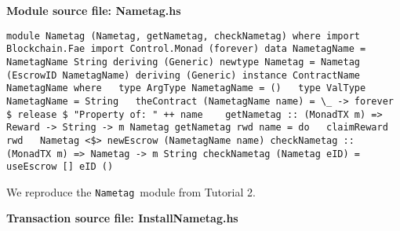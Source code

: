 \documentclass[11pt]{article}
\newcommand{\codeblock}[1]{\begin{mdframed}[
    backgroundcolor=header-color,
    linecolor=header-color,
    innertopmargin=10pt,
    ]{\texttt{#1}}\end{mdframed}}
\begin{document}

\vspace{11pt}

\textbf{Module source file: Nametag.hs}

\codeblock{module Nametag (Nametag, getNametag, checkNametag) where\newline
\newline
import Blockchain.Fae\newline
import Control.Monad (forever)\newline
\newline
data NametagName = NametagName String deriving (Generic)\newline
newtype Nametag = Nametag (EscrowID NametagName) deriving (Generic)\newline
\newline
instance ContractName NametagName where\newline
  type ArgType NametagName = ()\newline
  type ValType NametagName = String\newline
  theContract (NametagName name) = \textbackslash{}\_ -\textgreater{} forever \$ release \$ "Property of: " ++ name\newline
  \newline
getNametag :: (MonadTX m) =\textgreater{} Reward -\textgreater{} String -\textgreater{} m Nametag\newline
getNametag rwd name = do\newline
  claimReward rwd\newline
  Nametag \textless{}\$\textgreater{} newEscrow (NametagName name)\newline
\newline
checkNametag :: (MonadTX m) =\textgreater{} Nametag -\textgreater{} m String\newline
checkNametag (Nametag eID) = useEscrow {[}{]} eID ()}

We reproduce the \texttt{Nametag} module from Tutorial 2.


\vspace{11pt}

\textbf{Transaction source file: InstallNametag.hs}
\end{document}

